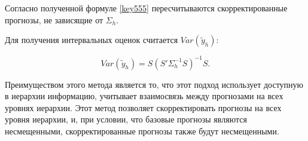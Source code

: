 \documentclass[12pt,a4paper, oneside]{extreport}
\begin{document}
 Согласно полученной формуле \ref{key555} пересчитываются скорректированные  прогнозы, не зависящие  от  $\Sigma_h$. 
 
 Для получения интервальных оценок считается   $Var(\tilde{y}_h)$:
 
\begin{equation}\label{key}
Var(\tilde{y}_h) =  S (S'\Sigma_h^{-1} S)^{−1}S.
\end{equation}



%
%
%
%
%
%
%
%
%
%	
%	
%	
%	
%	
%	
%	
%	
%	
%	
%	
%

Преимуществом этого метода является то, что этот подход использует  доступную в иерархии информацию, учитывает взаимосвязь   между  прогнозами  на всех  уровнях иерархии. 
Этот метод 
позволяет скорректировать прогнозы на всех уровня иерархии, и, при условии, что базовые прогнозы являются несмещенными, скорректированные прогнозы также будут несмещенными. 
\end{document}
